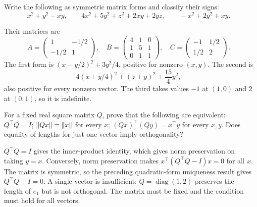 \begin{problem}\label{ex:09:forms}
Write the following as symmetric matrix forms and classify their signs:
\[
 x^2+y^2-xy,\qquad
 4x^2+5y^2+z^2+2xy+2yz,\qquad
 -x^2+2y^2+xy.
\]
\end{problem}
\begin{solution}
Their matrices are
\[
 A=\begin{pmatrix}1&-1/2\\-1/2&1\end{pmatrix},\quad
 B=\begin{pmatrix}4&1&0\\1&5&1\\0&1&1\end{pmatrix},\quad
 C=\begin{pmatrix}-1&1/2\\1/2&2\end{pmatrix}.
\]
The first form is \((x-y/2)^2+3y^2/4\), positive for nonzero \((x,y)\).
The second is
\[
 4(x+y/4)^2+(z+y)^2+\frac{15}{4}y^2,
\]
also positive for every nonzero vector.
The third takes values \(-1\) at \((1,0)\) and \(2\) at \((0,1)\),
so it is indefinite.
\end{solution}

\begin{problem}\label{ex:09:isometry}
For a fixed real square matrix \(Q\), prove that the following are equivalent:
\(Q^\top Q=I\); \(\left\lVert Qx\right\rVert=\left\lVert x\right\rVert\) for every \(x\);
\((Qx)^\top(Qy)=x^\top y\) for every \(x,y\).
Does equality of lengths for just one vector imply orthogonality?
\end{problem}
\begin{solution}
\(Q^\top Q=I\) gives the inner-product identity, which gives norm
preservation on taking \(y=x\).
Conversely, norm preservation makes
\(x^\top(Q^\top Q-I)x=0\) for all \(x\).
The matrix is symmetric, so the preceding quadratic-form uniqueness
result gives \(Q^\top Q-I=0\).
A single vector is insufficient: \(Q=\operatorname{diag}(1,2)\)
preserves the length of \(e_1\) but is not orthogonal.
The matrix must be fixed and the condition must hold for all vectors.
\end{solution}

